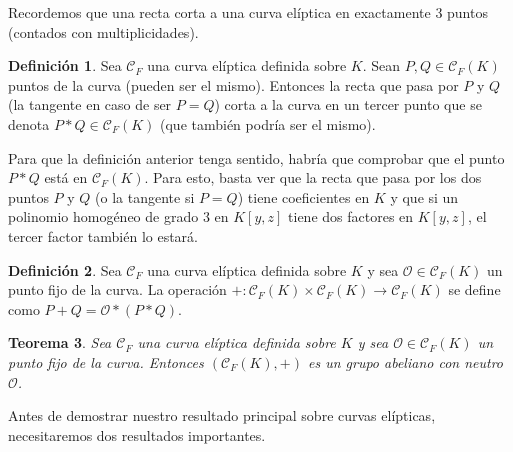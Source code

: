 \documentclass[a4paper, 11pt]{article}
\newcounter{numerodetema}
\theoremstyle{plain}
\newtheorem{teor}{Teorema}[numerodetema]
\theoremstyle{definition}
\newtheorem{defi}[teor]{Definición}
\begin{document}
\bigskip

Recordemos que una recta corta a una curva elíptica en exactamente $3$ puntos (contados
con multiplicidades).

\begin{defi}
Sea $\mathcal{C}_F$ una curva elíptica definida sobre $K$. Sean $P,Q\in\mathcal{C}_F(K)$
puntos de la curva (pueden ser el mismo). Entonces la recta que pasa por $P$ y $Q$ (la
tangente en caso de ser $P=Q$) corta a la curva en un tercer punto que se denota $P*Q\in\mathcal{C}_F(K)$ (que también podría ser el mismo).
\end{defi}

Para que la definición anterior tenga sentido, habría que comprobar que el punto $P*Q$
está en $\mathcal{C}_F(K)$. Para esto, basta ver que la recta que pasa por los dos
puntos $P$ y $Q$ (o la tangente si $P=Q$) tiene coeficientes en $K$ y que si un polinomio
homogéneo de grado $3$ en $K[y,z]$ tiene dos factores en $K[y,z]$, el tercer factor
también lo estará.

\bigskip

\begin{defi}
Sea $\mathcal{C}_F$ una curva elíptica definida sobre $K$ y sea $\mathcal{O}
\in\mathcal{C}_F(K)$ un punto fijo de la curva. La operación $+:\mathcal{C}_F(K)
\times\mathcal{C}_F(K)\to\mathcal{C}_F(K)$ se define como $P+Q=\mathcal{O}*(P*Q)$.
\end{defi}

\begin{teor}\label{teor-suma}
Sea $\mathcal{C}_F$ una curva elíptica definida sobre $K$ y sea $\mathcal{O}
\in\mathcal{C}_F(K)$ un punto fijo de la curva. Entonces $(\mathcal{C}_F(K),+)$ es
un grupo abeliano con neutro $\mathcal{O}$.
\end{teor}

Antes de demostrar nuestro resultado principal sobre curvas elípticas, necesitaremos
dos resultados importantes.
\end{document}
